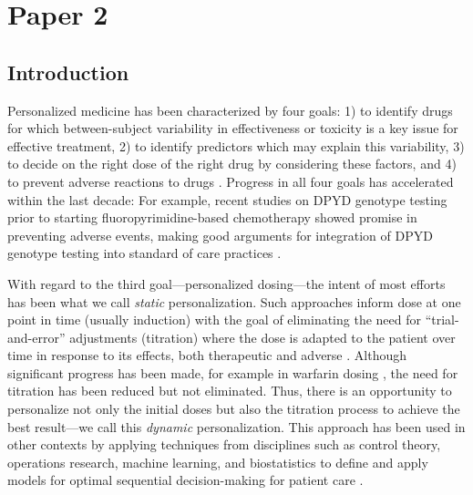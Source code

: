 \chapter{Paper 2}

\section{Introduction}

Personalized medicine has been characterized by four goals: 1) to identify drugs for which between-subject variability in effectiveness or toxicity is a key issue for effective treatment, 2) to identify predictors which may explain this variability, 3) to decide on the right dose of the right drug by considering these factors, and 4) to prevent adverse reactions to drugs \cite{morse2015personalized}.  Progress in all four goals has accelerated within the last decade: For example, recent studies on DPYD genotype testing prior to starting fluoropyrimidine-based chemotherapy showed promise in preventing adverse events, making good arguments for integration of DPYD genotype testing into standard of care practices \cite{wigle2019prospective}.  

With regard to the third goal---personalized dosing---the intent of most efforts has been what we call \textit{static} personalization. Such approaches inform dose at one point in time (usually induction) with the goal of eliminating the need for ``trial-and-error'' adjustments (titration) where the dose is adapted to the patient over time in response to its effects, both therapeutic and adverse \cite{morse2015personalized}. Although significant progress has been made, for example in warfarin dosing \cite{gong2011prospective}, the need for titration has been reduced but not eliminated. Thus, there is an opportunity to personalize not only the initial doses but also the titration process to achieve the best result---we call this \textit{dynamic} personalization. This approach has been used in other contexts by applying techniques from disciplines such as control theory, operations research, machine learning, and biostatistics to define and apply models for optimal sequential decision-making for patient care \cite{zhang2021identifying, engelhardt2021importance}.

